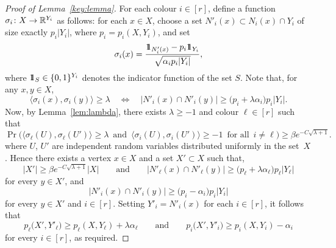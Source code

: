 \begin{proof}[Proof of Lemma~\ref{key:lemma}] 
For each colour $i \in [r]$, define a function $\sigma_i \colon X \rightarrow \mathbb{R}^{Y_i}$ as follows: for each $x \in X$, choose a set $N'_i(x) \subset N_i(x) \cap Y_i$ of size exactly $p_i|Y_i|$, where $p_i = p_i(X,Y_i)$, and set
$$\sigma_i(x) = \frac{\hbox{$1\mkern-6.5mu1$}_{N'_i(x)} - p_i\hbox{$1\mkern-6.5mu1$}_{Y_i}}{\sqrt{\alpha_ip_i|Y_i|}},$$
where $\hbox{$1\mkern-6.5mu1$}_S \in \{0,1\}^{Y_i}$ denotes the indicator function of the set $S$. Note that, for any $x,y\in X$,
$$\big\langle \sigma_i(x),\sigma_i(y) \big\rangle \ge \lambda \quad \Leftrightarrow \quad |N'_i(x) \cap N'_i(y)|\ge \big( p_i + \lambda\alpha_i \big) p_i |Y_i|.$$
Now, by Lemma~\ref{lem:lambda}, there exists $\lambda \ge -1$ and colour $\ell \in [r]$ such that
$$\Pr\Big( \big\langle \sigma_\ell(U),\sigma_\ell(U') \big\rangle \ge \lambda \, \text{ and } \, \big\langle \sigma_i(U), \sigma_i(U') \big\rangle \ge -1 \, \text{ for all } \, i \ne \ell \Big) \ge \beta e^{- C\sqrt{\lambda + 1}}.$$
where $U$, $U'$ are independent random variables distributed uniformly in the set~$X$. Hence there exists a vertex $x \in X$ and a set $X' \subset X$ such that, 
$$|X'| \ge \beta e^{- C \sqrt{\lambda + 1}} |X| \qquad \text{and} \qquad |N'_\ell(x) \cap N'_\ell(y)| \ge \big( p_\ell + \lambda\alpha_\ell \big) p_\ell |Y_\ell |$$
for every $y \in X'$, and
$$|N'_i(x) \cap N'_i(y)|\ge \big( p_i - \alpha_i \big) p_i |Y_i|$$
for every $y \in X'$ and $i \in [r]$. Setting $Y'_i = N'_i(x)$ for each $i \in [r]$, it follows that
$$p_\ell\big( X', Y'_\ell \big) \ge p_\ell(X,Y_\ell) + \lambda \alpha_\ell \qquad \text{and} \qquad p_i\big( X', Y'_i \big) \ge p_i(X,Y_i) - \alpha_i$$
for every $i \in [r]$, as required. 
\end{proof}